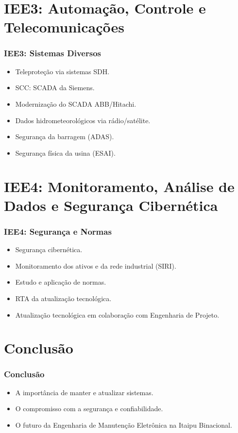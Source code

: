 \documentclass{beamer}
\begin{document}
\section[IEE3]{IEE3: Automação, Controle e Telecomunicações}
\begin{frame}
\frametitle{IEE3: Sistemas Diversos}
\begin{itemize}
    \item Teleproteção via sistemas SDH.
    \item SCC: SCADA da Siemens.
    \item Modernização do SCADA ABB/Hitachi.
    \item Dados hidrometeorológicos via rádio/satélite.
    \item Segurança da barragem (ADAS).
    \item Segurança física da usina (ESAI).
\end{itemize}
\end{frame}

\section[IEE4]{IEE4: Monitoramento, Análise de Dados e Segurança Cibernética}
\begin{frame}
\frametitle{IEE4: Segurança e Normas}
\begin{itemize}
    \item Segurança cibernética.
    \item Monitoramento dos ativos e da rede industrial (SIRI).
    \item Estudo e aplicação de normas.
    \item RTA da atualização tecnológica.
    \item Atualização tecnológica em colaboração com Engenharia de Projeto.
\end{itemize}
\end{frame}

\section[Conclusão]{Conclusão}
\begin{frame}
\frametitle{Conclusão}
\begin{itemize}
    \item A importância de manter e atualizar sistemas.
    \item O compromisso com a segurança e confiabilidade.
    \item O futuro da Engenharia de Manutenção Eletrônica na Itaipu Binacional.
\end{itemize}
\end{frame}
\end{document}
